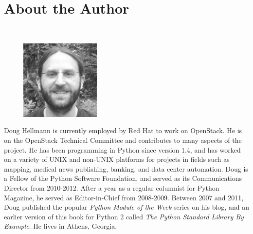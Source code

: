 \cleardoublepage
\chapter*{About the Author}

\hspace*{\fill}\\  
\par\begin{figure}\includegraphics[width=4cm]{AuthorPhoto}\end{figure}\noindent Doug Hellmann is currently employed by Red Hat to work on
OpenStack. He is on the OpenStack Technical Committee and contributes
to many aspects of the project. He has been programming in Python
since version 1.4, and has worked on a variety of UNIX and non-UNIX
platforms for projects in fields such as mapping, medical news
publishing, banking, and data center automation. Doug is a Fellow of
the Python Software Foundation, and served as its Communications
Director from 2010-2012. After a year as a regular columnist for
Python Magazine, he served as Editor-in-Chief from 2008-2009. Between
2007 and 2011, Doug published the popular \textit{Python Module of the
Week} series on his blog, and an earlier version of this book for
Python 2 called \textit{The Python Standard Library By Example}. He
lives in Athens, Georgia.

